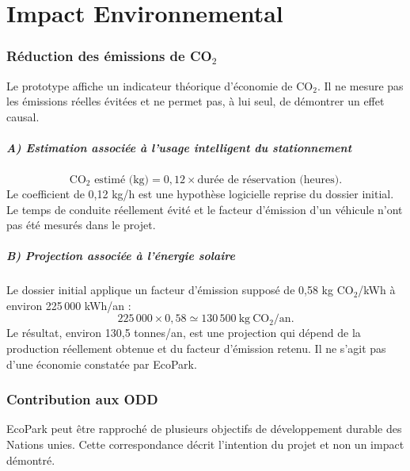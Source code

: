 \documentclass[12pt,a4paper]{report}
\begin{document}
\chapter{Impact Environnemental}

\subsection{Réduction des émissions de CO$_2$}

Le prototype affiche un indicateur théorique d'économie de CO$_2$. Il ne mesure pas les émissions réelles évitées et ne permet pas, à lui seul, de démontrer un effet causal.

\paragraph{A) Estimation associée à l'usage intelligent du stationnement}
\[
\text{CO}_2\text{ estimé (kg)} =
0{,}12 \times \text{durée de réservation (heures)}.
\]
Le coefficient de 0,12 kg/h est une hypothèse logicielle reprise du dossier initial. Le temps de conduite réellement évité et le facteur d'émission d'un véhicule n'ont pas été mesurés dans le projet.

\paragraph{B) Projection associée à l'énergie solaire}
Le dossier initial applique un facteur d'émission supposé de 0,58 kg CO$_2$/kWh à environ 225\,000 kWh/an :
\[
225\,000 \times 0{,}58 \simeq 130\,500\ \mathrm{kg\ CO_2/an}.
\]
Le résultat, environ 130,5 tonnes/an, est une projection qui dépend de la production réellement obtenue et du facteur d'émission retenu. Il ne s'agit pas d'une économie constatée par EcoPark.

\subsection{Contribution aux ODD}

EcoPark peut être rapproché de plusieurs objectifs de développement durable des Nations unies. Cette correspondance décrit l'intention du projet et non un impact démontré.
\end{document}
